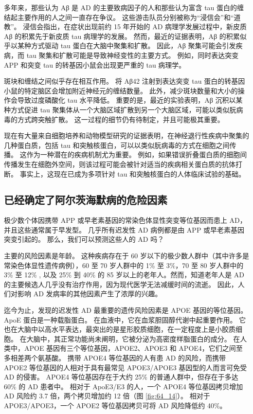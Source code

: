 多年来，那些认为 Aβ 是 AD 的主要致病因子的人和那些认为富含 tau 蛋白的缠结起主要作用的人之间一直存在争议。 这些游击队员分别被称为“浸信会”和“道教”。 浸信会指出，在症状出现前约 15 年开始的 AD 病理学发展过程中，新皮质 Aβ 的积累先于新皮质 tau 病理学的发展。 然而，最近的证据表明，Aβ 的积累似乎以某种方式驱动 tau 蛋白在大脑中聚集和扩散。 因此，Aβ 聚集可能会引发疾病，而 tau 聚集和扩散可能是导致神经变性的主要方式。 例如，同时表达突变 APP 和突变 tau 的转基因小鼠会出现更严重的 tau 病理学。

斑块和缠结之间似乎存在相互作用。 将 Aβ42 注射到表达突变 tau 蛋白的转基因小鼠的特定脑区会增加附近神经元的缠结数量。 此外，减少斑块数量和大小的操作会导致过度磷酸化 tau 水平降低。 重要的是，最近的实验表明，Aβ 沉积以某种方式促进 tau 聚集体从一个大脑区域扩散到另一个大脑区域，可能以类似朊病毒的方式跨突触扩散。 这一过程的细节仍有待制定，并且可能极其重要。

现在有大量来自细胞培养和动物模型研究的证据表明，在神经退行性疾病中聚集的几种蛋白质，包括 tau 和突触核蛋白，可以以类似朊病毒的方式在细胞之间传播。 这作为一种潜在的疾病机制尤为重要。 例如，如果错误折叠蛋白质的细胞间传播发生在细胞外空间，则该过程可能会被针对适当的疾病相关蛋白质的抗体打断。 事实上，这现在已成为多项针对 tau 和突触核蛋白的人体临床试验的基础。

\subsection{已经确定了阿尔茨海默病的危险因素}
极少数个体因携带 APP 或早老素基因的常染色体显性突变等位基因而患上 AD，并且这些通常属于早发型。 几乎所有迟发性 AD 病例都是由 APP 或早老素基因突变引起的。 那么，我们可以预测这些人的 AD 吗？

主要的风险因素是年龄。 这种疾病存在于 60 岁以下的极少数人群中（其中许多是常染色体显性遗传病例），60 至 70 岁人群中的 1\% 至 3\%，70 至 80 岁人群中的 3\% 至 12\% , 以及 25\% 到 40\% 的 85 岁以上的老年人。然而，知道老年人是 AD 的主要候选人几乎没有治疗作用，因为现代医学无法减缓时间的流逝。 因此，人们对影响 AD 发病率的其他因素产生了浓厚的兴趣。

迄今为止，发现的迟发性 AD 最重要的遗传风险因素是 APOE 基因的等位基因。 ApoE 蛋白是一种载脂蛋白。 在血液中，它在血浆胆固醇代谢中起重要作用。 它也在大脑中以高水平表达，最突出的是星形胶质细胞，在一定程度上是小胶质细胞。 在大脑中，其正常功能尚未阐明，它被分泌为高密度样脂蛋白的成分。 在人类中，APOE 基因有三个等位基因，APOE2、APOE3 和 APOE4，它们之间至多相差两个氨基酸。 携带 APOE4 等位基因的人有患 AD 的风险，而携带 APOE2 等位基因的人相对于具有最常见 APOE3/APOE3 基因型的人而言可免受 AD 的侵害。 APOE4 等位基因存在于大约 25\% 的普通人群中，但存在于多达 60\% 的 AD 患者中。 相对于 ApoE3/E3 的人，一个 APOE4 等位基因拷贝增加 AD 风险约 3.7 倍，两个拷贝增加约 12 倍（图 \ref{fig:64_14}）。 相对于 APOE3/APOE3，一个 APOE2 等位基因拷贝可将 AD 风险降低约 40\%。


